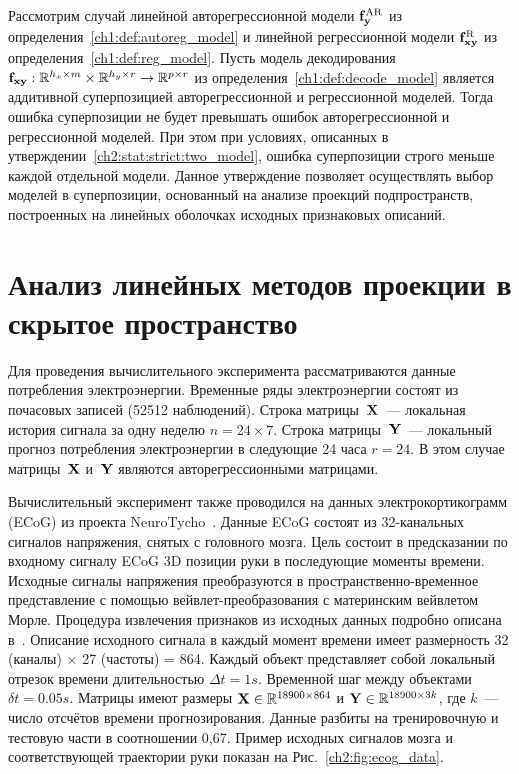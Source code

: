 Рассмотрим случай линейной авторегрессионной модели $\mathbf{f}^{\text{AR}}_{\mathbf{y}}$ из определения~\ref{ch1:def:autoreg_model} и линейной регрессионной модели $\mathbf{f}^{\text{R}}_{\mathbf{x}\mathbf{y}}$ из определения~\ref{ch1:def:reg_model}. 
Пусть модель декодирования $\mathbf{f}_{\mathbf{x}\mathbf{y}}: \mathbb{R}^{h_x \times m} \times \mathbb{R}^{h_y \times r} \rightarrow \mathbb{R}^{p \times r}$ из определения~\ref{ch1:def:decode_model} является аддитивной суперпозицией авторегрессионной и регрессионной моделей.
Тогда ошибка суперпозиции не будет превышать ошибок авторегрессионной и регрессионной моделей.
При этом при условиях, описанных в утверждении~\ref{ch2:stat:strict:two_model}, ошибка суперпозиции строго меньше каждой отдельной модели.
Данное утверждение позволяет осуществлять выбор моделей в суперпозиции, основанный на анализе проекций подпространств, построенных на линейных оболочках исходных признаковых описаний.

\section{Анализ линейных методов проекции в скрытое пространство}
\label{sec:ch2:exp_linear}

Для проведения вычислительного эксперимента рассматриваются данные потребления электроэнергии.
Временные ряды электроэнергии состоят из почасовых записей (52512 наблюдений). 
Строка матрицы~$\mathbf{X}$~--- локальная история сигнала за одну неделю $n = 24 \times 7$. 
Строка матрицы~$\mathbf{Y}$~--- локальный прогноз потребления электроэнергии в следующие 24 часа $r = 24$. 
В этом случае матрицы~$\mathbf{X}$ и~$\mathbf{Y}$ являются авторегрессионными матрицами.

Вычислительный эксперимент также проводился на данных электрокортикограмм (ECoG) из проекта NeuroTycho~\cite{shimoda2012decoding}.
Данные ECoG состоят из 32-канальных сигналов напряжения, снятых с головного мозга.
Цель состоит в предсказании по входному сигналу ECoG 3D позиции руки в последующие моменты времени.
Исходные сигналы напряжения преобразуются в пространственно-временное представление с помощью вейвлет-преобразования с материнским вейвлетом Морле.
Процедура извлечения признаков из исходных данных подробно описана в~\cite{chao2010long,eliseyev2016penalized}.
Описание исходного сигнала в каждый момент времени имеет размерность 32 (каналы) $\times $ 27 (частоты) = 864.
Каждый объект представляет собой локальный отрезок времени длительностью $\Delta t = 1s$. 
Временной шаг между объектами $\delta t = 0.05 s$.
Матрицы имеют размеры $\mathbf{X} \in \mathbb{R}^{18900 \times 864}$ и $\mathbf{Y} \in \mathbb{R}^{18900 \times 3k}$, где $k$~--- число отсчётов времени прогнозирования.
Данные разбиты на тренировочную и тестовую части в соотношении 0,67. 
Пример исходных сигналов мозга и соответствующей траектории руки показан на Рис.~\ref{ch2:fig:ecog_data}.

